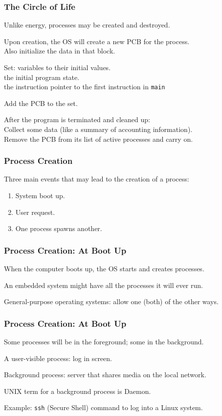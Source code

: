 \begin{frame}
\frametitle{The Circle of Life}


Unlike energy, processes may be created and destroyed. 

Upon creation, the OS will create a new PCB for the process.\\
\quad Also initialize the data in that block. 

Set: variables to their initial values.\\
\quad the initial program state.\\
\quad the instruction pointer to the first instruction in \texttt{main}

Add the PCB to the set.

After the program is terminated and cleaned up:\\
\quad Collect some data (like a summary of accounting information).\\
\quad Remove the PCB from its list of active processes and carry on.


\end{frame}

\begin{frame}
\frametitle{Process Creation}

Three main events that may lead to the creation of a process:

\begin{enumerate}
	\item System boot up.
	\item User request.
	\item One process spawns another.
\end{enumerate}


\end{frame}

\begin{frame}
\frametitle{Process Creation: At Boot Up}

When the computer boots up, the OS starts and creates processes.

An embedded system might have all the processes it will ever run.

General-purpose operating systems: allow one (both) of the other ways.


\end{frame}

\begin{frame}
\frametitle{Process Creation: At Boot Up}

Some processes will be in the foreground; some in the background. 

A user-visible process: log in screen.

Background process: server that shares media on the local network. 

UNIX term for a background process is \alert{Daemon}.

Example: \texttt{ssh} (Secure Shell) command to log into a Linux system.


\end{frame}

